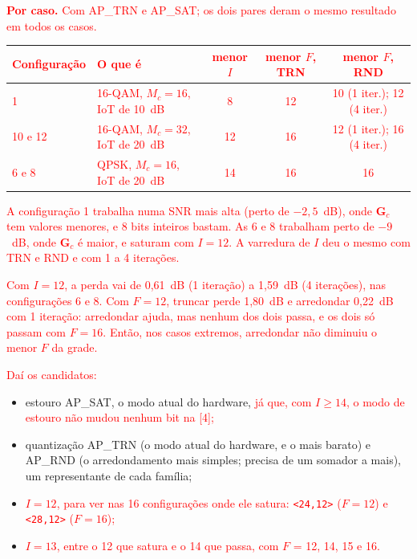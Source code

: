 \documentclass[11pt]{article}
\newcommand{\novo}[1]{\textcolor{red}{#1}}
\begin{document}
\novo{\textbf{Por caso.} Com AP\_TRN e AP\_SAT; os dois pares deram o mesmo resultado em todos os casos.}
\begin{center}
\small
\renewcommand{\arraystretch}{1.15}
\begin{tabular}{|l|l|c|c|c|}
\hline
\novo{Configuração} & \novo{O que é} & \novo{menor $I$} & \novo{menor $F$, TRN} & \novo{menor $F$, RND} \\
\hline
\novo{1} & \novo{16-QAM, $M_c = 16$, IoT de 10~dB} & \novo{8} & \novo{12} & \novo{10 (1 iter.); 12 (4 iter.)} \\
\novo{10 e 12} & \novo{16-QAM, $M_c = 32$, IoT de 20~dB} & \novo{12} & \novo{16} & \novo{12 (1 iter.); 16 (4 iter.)} \\
\novo{6 e 8} & \novo{QPSK, $M_c = 16$, IoT de 20~dB} & \novo{14} & \novo{16} & \novo{16} \\
\hline
\end{tabular}
\end{center}
\novo{A configuração 1 trabalha numa SNR mais alta (perto de $-2{,}5$~dB), onde $\mathbf G_c$ tem
valores menores, e 8 bits inteiros bastam. As 6 e 8 trabalham perto de $-9$~dB, onde
$\mathbf G_c$ é maior, e saturam com $I = 12$. A varredura de $I$ deu o mesmo com TRN e RND e
com 1 a 4 iterações.}

\novo{Com $I = 12$, a perda vai de 0,61~dB (1 iteração) a 1,59~dB (4 iterações), nas
configurações 6 e 8. Com $F = 12$, truncar perde 1,80~dB e arredondar 0,22~dB com 1 iteração:
arredondar ajuda, mas nenhum dos dois passa, e os dois só passam com $F = 16$. Então, nos casos
extremos, arredondar não diminuiu o menor $F$ da grade.}

\novo{Daí os candidatos:}
\begin{itemize}
  \item estouro AP\_SAT, o modo atual do hardware, \novo{já que, com $I \ge 14$, o modo de estouro
        não mudou nenhum bit na [4];}
  \item quantização AP\_TRN (o modo atual do hardware, e o mais barato) e AP\_RND (o
        arredondamento mais simples; precisa de um somador a mais), um representante de cada família;
  \item \novo{$I = 12$, para ver nas 16 configurações onde ele satura: \texttt{<24,12>} ($F = 12$) e
        \texttt{<28,12>} ($F = 16$);}
  \item \novo{$I = 13$, entre o 12 que satura e o 14 que passa, com $F$ = 12, 14, 15 e 16.}
\end{itemize}
\end{document}
